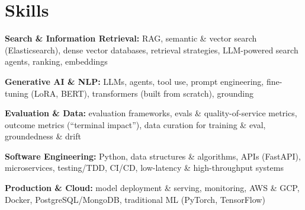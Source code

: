 \documentclass[10pt,a4paper]{article}
\begin{document}
\section{Skills}
\begin{tight}
  \item[\textcolor{accent}{\small$\bullet$}] \textbf{Search \& Information Retrieval:} RAG, semantic \& vector search (Elasticsearch), dense vector databases, retrieval strategies, LLM-powered search agents, ranking, embeddings
  \item[\textcolor{accent}{\small$\bullet$}] \textbf{Generative AI \& NLP:} LLMs, agents, tool use, prompt engineering, fine-tuning (LoRA, BERT), transformers (built from scratch), grounding
  \item[\textcolor{accent}{\small$\bullet$}] \textbf{Evaluation \& Data:} evaluation frameworks, evals \& quality-of-service metrics, outcome metrics (``terminal impact''), data curation for training \& eval, groundedness \& drift
  \item[\textcolor{accent}{\small$\bullet$}] \textbf{Software Engineering:} Python, data structures \& algorithms, APIs (FastAPI), microservices, testing/TDD, CI/CD, low-latency \& high-throughput systems
  \item[\textcolor{accent}{\small$\bullet$}] \textbf{Production \& Cloud:} model deployment \& serving, monitoring, AWS \& GCP, Docker, PostgreSQL/MongoDB, traditional ML (PyTorch, TensorFlow)
\end{tight}

\end{document}
